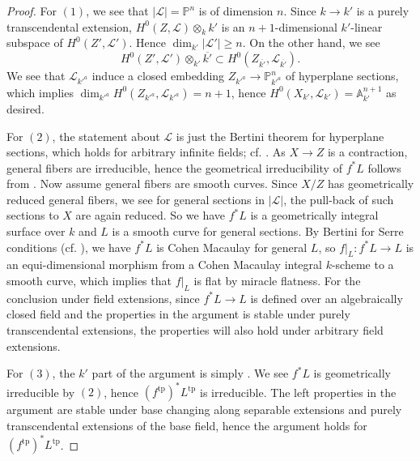 \documentclass[letterpaper,reqno,12pt]{amsart}
\newcommand{\tp}{\mathrm{tp}}
\numberwithin{equation}{section}
\theoremstyle{plain}
\begin{document}
\begin{proof}
    For $(1)$, we see that $|\mathscr L|=\mathbb P^n$ is of dimension $n$. Since $k\to k'$ is a purely transcendental extension, $H^0(Z,\mathscr L)\otimes _k k'$ is an $n+1$-dimensional $k'$-linear subspace of $H^0(Z', \mathscr L')$. Hence $\dim_{k'}|\mathscr L'|\geq n$. On the other hand, we see \[H^0(Z', \mathscr L')\otimes_{k'}\overline{k'}\subset H^0(Z_{\overline{k'}},\mathscr L_{\overline {k'}}).\] We see that $\mathscr L_{{k'}^a}$ induce a closed embedding $Z_{{k'}^a}\to \mathbb P^n_{{k'}^a}$ of hyperplane sections, which implies $\dim_{{k'}^a}H^0(Z_{{k'}^a},\mathscr L_{{k'}^a})=n+1$, hence $H^0(X_{k'},\mathscr L_{k'})=\mathbb A^{n+1}_{k'}$ as desired.%

    For $(2)$, the statement about $\mathscr L$ is just the Bertini theorem for hyperplane sections, which holds for arbitrary infinite fields; cf. \cite[Theorem~3.4.14]{joinsandintersections}. As $X\to Z$ is a contraction, general fibers are irreducible,%
    hence the geometrical irreducibility of $f^*L$ follows from \cite[6.10.3]{Bertini}. Now assume general fibers are smooth curves. Since $X/Z$ has geometrically reduced general fibers, we see for general sections in $|\mathscr L|$, the pull-back of such sections to $X$ are again reduced.%
    So we have $f^*L$ is a geometrically integral surface over $k$ and $L$ is a smooth curve for general sections. By Bertini for Serre conditions (cf. \cite[Theorem~3.4.5]{joinsandintersections}),%
    we have $f^*L$ is Cohen Macaulay for general $L$, so $f|_L:f^*L\to L$ is an equi-dimensional morphism from a Cohen Macaulay integral $k$-scheme to a smooth curve, which implies that $f|_L$ is flat by miracle flatness.%
    For the conclusion under field extensions, since $f^*L\to L$ is defined over an algebraically closed field and the properties in the argument is stable under purely transcendental extensions, the properties will also hold under arbitrary field extensions.%

    For $(3)$, the $k'$ part of the argument is simply \cite[Theorem 5.4]{Bertinibasechange}. We see $f^*L$ is geometrically irreducible by $(2)$, hence $(f^\tp)^*L^\tp$ is irreducible. The left properties in the argument are stable under base changing along separable extensions and purely transcendental extensions%
    of the base field, hence the argument holds for $(f^\tp)^*L^\tp$.
\end{proof}
\end{document}
